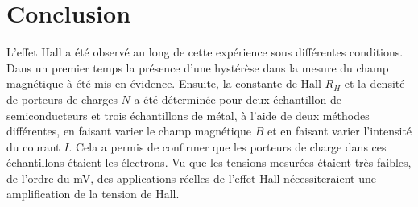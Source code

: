 \section{Conclusion}

L'effet Hall a été observé au long de cette expérience sous différentes conditions. Dans un premier temps la présence d'une hystérèse dans la mesure du champ magnétique à été mis en évidence. Ensuite, la constante de Hall \(R_H\) et la densité de porteurs de charges \(N\) a été déterminée pour deux échantillon de semiconducteurs et trois échantillons de métal, à l'aide de deux méthodes différentes, en faisant varier le champ magnétique \(B\) et en faisant varier l'intensité du courant \(I\). Cela a permis de confirmer que les porteurs de charge dans ces échantillons étaient les électrons. Vu que les tensions mesurées étaient très faibles, de l'ordre du \si{\milli\volt}, des applications réelles de l'effet Hall nécessiteraient une amplification de la tension de Hall.